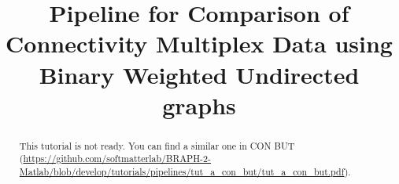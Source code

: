 \documentclass[justified]{tufte-handout}
\title{Pipeline for Comparison of Connectivity Multiplex Data using Binary Weighted Undirected graphs}
\begin{document}
\maketitle

\begin{abstract}
\noindent
This tutorial is not ready. You can find a similar one in CON BUT (\url{https://github.com/softmatterlab/BRAPH-2-Matlab/blob/develop/tutorials/pipelines/tut_a_con_but/tut_a_con_but.pdf}).
\end{abstract}
\end{document}
